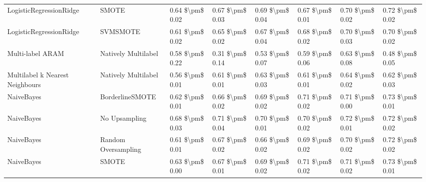 \begin{tabular}{llllllll}
        LogisticRegressionRidge &                         SMOTE &     0.64 \$\textbackslash pm\$ 0.02 &           0.67 \$\textbackslash pm\$ 0.03 &       0.69 \$\textbackslash pm\$ 0.04 &        0.67 \$\textbackslash pm\$ 0.01 &                         0.70 \$\textbackslash pm\$ 0.02 &     0.72 \$\textbackslash pm\$ 0.02 \\
        LogisticRegressionRidge &                      SVMSMOTE &     0.61 \$\textbackslash pm\$ 0.02 &           0.65 \$\textbackslash pm\$ 0.02 &       0.67 \$\textbackslash pm\$ 0.04 &        0.68 \$\textbackslash pm\$ 0.02 &                         0.70 \$\textbackslash pm\$ 0.03 &     0.70 \$\textbackslash pm\$ 0.02 \\
               Multi-label ARAM &           Natively Multilabel &     0.58 \$\textbackslash pm\$ 0.22 &           0.31 \$\textbackslash pm\$ 0.14 &       0.53 \$\textbackslash pm\$ 0.07 &        0.59 \$\textbackslash pm\$ 0.06 &                         0.63 \$\textbackslash pm\$ 0.08 &     0.48 \$\textbackslash pm\$ 0.05 \\
Multilabel k Nearest Neighbours &           Natively Multilabel &     0.56 \$\textbackslash pm\$ 0.01 &           0.61 \$\textbackslash pm\$ 0.01 &       0.63 \$\textbackslash pm\$ 0.03 &        0.61 \$\textbackslash pm\$ 0.01 &                         0.64 \$\textbackslash pm\$ 0.02 &     0.62 \$\textbackslash pm\$ 0.03 \\
                     NaiveBayes &               BorderlineSMOTE &     0.62 \$\textbackslash pm\$ 0.01 &           0.66 \$\textbackslash pm\$ 0.02 &       0.69 \$\textbackslash pm\$ 0.02 &        0.71 \$\textbackslash pm\$ 0.02 &                         0.71 \$\textbackslash pm\$ 0.00 &     0.73 \$\textbackslash pm\$ 0.01 \\
                     NaiveBayes &                 No Upsampling &     0.68 \$\textbackslash pm\$ 0.03 &           0.71 \$\textbackslash pm\$ 0.04 &       0.70 \$\textbackslash pm\$ 0.01 &        0.70 \$\textbackslash pm\$ 0.02 &                         0.72 \$\textbackslash pm\$ 0.01 &     0.72 \$\textbackslash pm\$ 0.02 \\
                     NaiveBayes &           Random Oversampling &     0.61 \$\textbackslash pm\$ 0.01 &           0.67 \$\textbackslash pm\$ 0.02 &       0.66 \$\textbackslash pm\$ 0.02 &        0.69 \$\textbackslash pm\$ 0.02 &                         0.70 \$\textbackslash pm\$ 0.02 &     0.72 \$\textbackslash pm\$ 0.02 \\
                     NaiveBayes &                         SMOTE &     0.63 \$\textbackslash pm\$ 0.00 &           0.67 \$\textbackslash pm\$ 0.01 &       0.69 \$\textbackslash pm\$ 0.02 &        0.71 \$\textbackslash pm\$ 0.02 &                         0.71 \$\textbackslash pm\$ 0.02 &     0.73 \$\textbackslash pm\$ 0.01 \\

\end{tabular}
